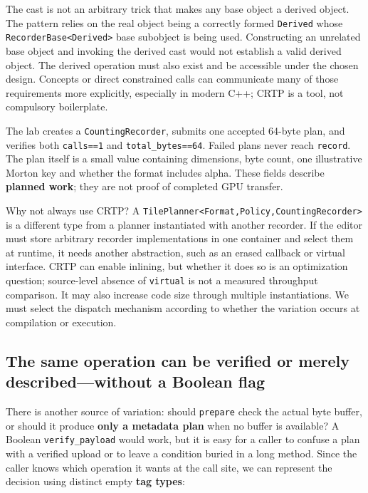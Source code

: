 The cast is not an arbitrary trick that makes any base object a derived object. The pattern relies on the real object being a correctly formed \texttt{Derived} whose \texttt{RecorderBase\textless{}Derived\textgreater{}} base subobject is being used. Constructing an unrelated base object and invoking the derived cast would not establish a valid derived object. The derived operation must also exist and be accessible under the chosen design. Concepts or direct constrained calls can communicate many of those requirements more explicitly, especially in modern C++; CRTP is a tool, not compulsory boilerplate.

The lab creates a \texttt{CountingRecorder}, submits one accepted 64-byte plan, and verifies both \texttt{calls==1} and \texttt{total\_bytes==64}. Failed plans never reach \texttt{record}. The plan itself is a small value containing dimensions, byte count, one illustrative Morton key and whether the format includes alpha. These fields describe \textbf{planned work}; they are not proof of completed GPU transfer.

Why not always use CRTP? A \texttt{TilePlanner\textless{}Format,Policy,CountingRecorder\textgreater{}} is a different type from a planner instantiated with another recorder. If the editor must store arbitrary recorder implementations in one container and select them at runtime, it needs another abstraction, such as an erased callback or virtual interface. CRTP can enable inlining, but whether it does so is an optimization question; source-level absence of \texttt{virtual} is not a measured throughput comparison. It may also increase code size through multiple instantiations. We must select the dispatch mechanism according to whether the variation occurs at compilation or execution.

\subsection{The same operation can be verified or merely described---without a Boolean flag}\label{01-foundations-i-ch005-the-same-operation-can-be-verified-or-merely-describedwithout-a-boolean-flag}

There is another source of variation: should \texttt{prepare} check the actual byte buffer, or should it produce \textbf{only a metadata plan} when no buffer is available? A Boolean \texttt{verify\_payload} would work, but it is easy for a caller to confuse a plan with a verified upload or to leave a condition buried in a long method. Since the caller knows which operation it wants at the call site, we can represent the decision using distinct empty \textbf{tag types}:


